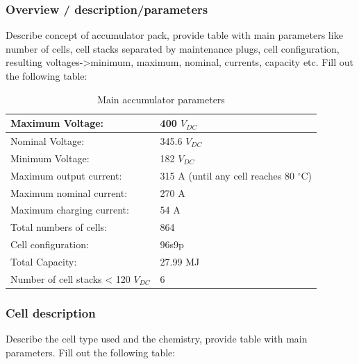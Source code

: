 \subsubsection{Overview / description/parameters}
Describe concept of accumulator pack, provide table with main parameters like number of cells, cell stacks separated by maintenance plugs, cell configuration, resulting voltages->minimum, maximum, nominal, currents, capacity etc.
Fill out the following table:

\begin{table}[H]
	\centering
	\caption{Main accumulator parameters}
	\begin{tabularx}{\textwidth}{|X|X|}
		\hline
		Maximum Voltage: & 400 $V_{DC}$ \\[\TableSize]
		\hline
		Nominal Voltage: & 345.6 $V_{DC}$ \\[\TableSize]
		\hline
		Minimum Voltage: & 182 $V_{DC}$ \\[\TableSize]
		\hline
		Maximum output current: & 315 A (until any cell reaches 80 $^\circ$C) \\[\TableSize]
		\hline
		Maximum nominal current: & 270 A \\[\TableSize]
		\hline
		Maximum charging current: & 54 A \\[\TableSize]
		\hline
		Total numbers of cells: & 864 \\[\TableSize]
		\hline
		Cell configuration: & 96s9p \\[\TableSize]
		\hline
		Total Capacity: & 27.99 MJ \\[\TableSize]
		\hline
		Number of cell stacks < 120 $V_{DC}$ & 6 \\[\TableSize]
		\hline
	\end{tabularx}%
	\label{tab:acc-main}%
\end{table}%

\subsubsection{Cell description}
Describe the cell type used and the chemistry, provide table with main parameters.
Fill out the following table:

